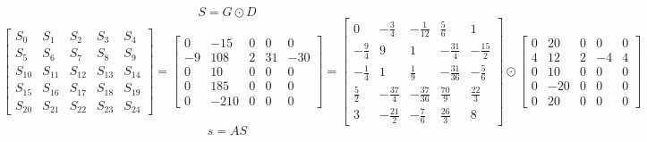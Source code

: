 \documentclass{article}%
\begin{document}
\[%
S = G \odot D%
\]%
\[%
\left[\begin{matrix}S_{0} & S_{1} & S_{2} & S_{3} & S_{4}\\S_{5} & S_{6} & S_{7} & S_{8} & S_{9}\\S_{10} & S_{11} & S_{12} & S_{13} & S_{14}\\S_{15} & S_{16} & S_{17} & S_{18} & S_{19}\\S_{20} & S_{21} & S_{22} & S_{23} & S_{24}\end{matrix}\right] = \left[\begin{matrix}0 & -15 & 0 & 0 & 0\\-9 & 108 & 2 & 31 & -30\\0 & 10 & 0 & 0 & 0\\0 & 185 & 0 & 0 & 0\\0 & -210 & 0 & 0 & 0\end{matrix}\right] = \left[\begin{matrix}0 & - \frac{3}{4} & - \frac{1}{12} & \frac{5}{6} & 1\\- \frac{9}{4} & 9 & 1 & - \frac{31}{4} & - \frac{15}{2}\\- \frac{1}{4} & 1 & \frac{1}{9} & - \frac{31}{36} & - \frac{5}{6}\\\frac{5}{2} & - \frac{37}{4} & - \frac{37}{36} & \frac{70}{9} & \frac{22}{3}\\3 & - \frac{21}{2} & - \frac{7}{6} & \frac{26}{3} & 8\end{matrix}\right] \odot \left[\begin{matrix}0 & 20 & 0 & 0 & 0\\4 & 12 & 2 & -4 & 4\\0 & 10 & 0 & 0 & 0\\0 & -20 & 0 & 0 & 0\\0 & 20 & 0 & 0 & 0\end{matrix}\right]%
\]%
\[%
s = AS%
\]%
\end{document}
